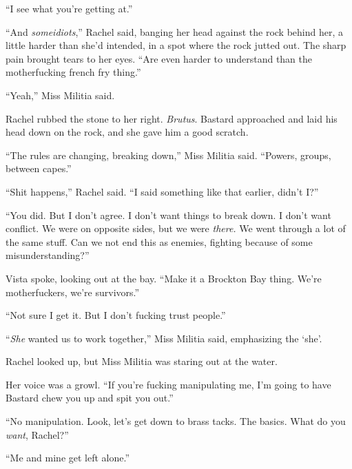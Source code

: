 ``I see what you're getting at.''



``And \emph{some}\emph{idiots},'' Rachel said, banging her head against the rock behind her, a little harder than she'd intended, in a spot where the rock jutted out.   The sharp pain brought tears to her eyes.  ``Are even harder to understand than the motherfucking french fry thing.''



``Yeah,'' Miss Militia said.



Rachel rubbed the stone to her right.  \emph{Brutus}.  Bastard approached and laid his head down on the rock, and she gave him a good scratch.



``The rules are changing, breaking down,'' Miss Militia said.  ``Powers, groups, between capes.''



``Shit happens,'' Rachel said.  ``I said something like that earlier, didn't I?''



``You did.  But I don't agree.  I don't want things to break down.  I don't want conflict.  We were on opposite sides, but we were \emph{there.  }We went through a lot of the same stuff.  Can we not end this as enemies, fighting because of some misunderstanding?''



Vista spoke, looking out at the bay.  ``Make it a Brockton Bay thing.  We're motherfuckers, we're survivors.''



``Not sure I get it.  But I don't fucking trust people.''



``\emph{She} wanted us to work together,'' Miss Militia said, emphasizing the `she'.



Rachel looked up, but Miss Militia was staring out at the water.



Her voice was a growl.  ``If you're fucking manipulating me, I'm going to have Bastard chew you up and spit you out.''



``No manipulation.  Look, let's get down to brass tacks.  The basics.  What do you \emph{want}, Rachel?''



``Me and mine get left alone.''



